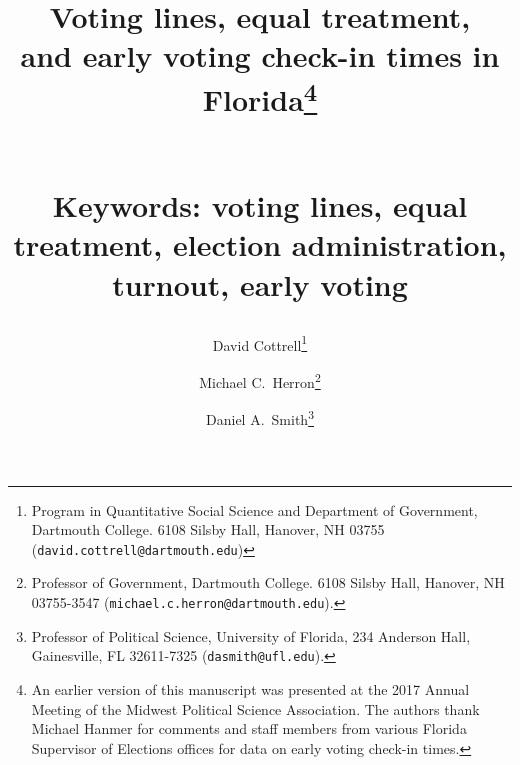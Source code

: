 \documentclass[12pt,titlepage]{article}
\providecommand{\keywords}[1]{\textbf{\normalsize{Keywords: }} \normalsize{#1}}
\begin{document}
\sloppy
\thispagestyle{empty}


\renewcommand{\topfraction}{.85}
\renewcommand{\bottomfraction}{.7}
\renewcommand{\textfraction}{.15}
\renewcommand{\floatpagefraction}{.66}
\renewcommand{\dbltopfraction}{.66}
\renewcommand{\dblfloatpagefraction}{.66}



\title{Voting lines, equal treatment,\\and early voting check-in times
  in Florida\thanks{An earlier version of this manuscript was
    presented at the 2017 Annual Meeting of the Midwest Political
    Science Association.  The authors thank Michael Hanmer for
    comments and staff members from various Florida Supervisor of
    Elections offices for data on early voting check-in
    times.}\author{David Cottrell\thanks{Program in Quantitative
      Social Science and Department of Government, Dartmouth College.
      6108 Silsby Hall, Hanover, NH 03755
      (\texttt{david.cottrell@dartmouth.edu})} \and Michael C.\
    Herron\thanks{Professor of Government, Dartmouth College.  6108
      Silsby Hall, Hanover, NH 03755-3547
      (\texttt{michael.c.herron@dartmouth.edu}).} \and Daniel A.\
    Smith\thanks{Professor of Political Science, University of
      Florida, 234 Anderson Hall, Gainesville, FL 32611-7325
      (\texttt{dasmith@ufl.edu}).}}\vspace{1cm}\\\keywords{voting
    lines, equal treatment, election administration, turnout, early
    voting}}

\maketitle \doublespacing 



\end{document}

